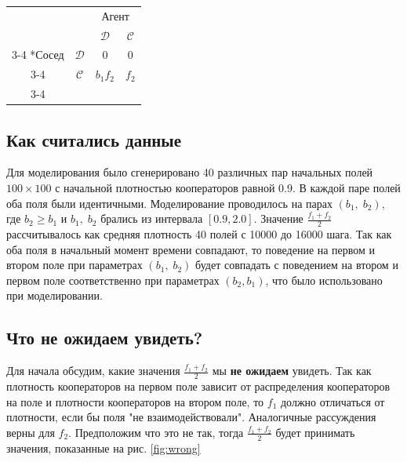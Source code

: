 \documentclass[12pt]{article}
\begin{document}
    \begin{minipage}{\linewidth}
    \centering
     \label{tab:2} 
    \setlength{\extrarowheight}{2pt}
    \begin{tabular}{cc|c|c|}
      & \multicolumn{1}{c}{} & \multicolumn{2}{c}{Агент}\\
      & \multicolumn{1}{c}{} & \multicolumn{1}{c}{$\mathcal{D}$}  & \multicolumn{1}{c}{$\mathcal{C}$} \\\cline{3-4}
      \multirow{2}*{Сосед}  & $\mathcal{D}$ & $0$ & $0$ \\\cline{3-4}
      & $\mathcal{C}$ & $b_1 f_2$ & $f_2$ \\\cline{3-4}
    \end{tabular}
    \end{minipage}
  
\subsection{Как считались данные}
    Для моделирования было сгенерировано 40 различных пар начальных полей $100\times100$ с начальной плотностью кооператоров равной $0.9$. В каждой паре полей оба поля были идентичными.
    Моделирование проводилось на парах $(b_1,\;b_2)$, где $b_2 \geq b_1$ и $b_1,\;b_2$ брались из интервала $[0.9, 2.0]$. Значение $\frac{f_1+f_2}{2}$ рассчитывалось как средняя плотность 40 полей с 10000 до 16000 шага.
    Так как оба поля в начальный момент времени совпадают, то поведение на первом и втором поле при параметрах $(b_1,\;b_2)$ будет совпадать с поведением на втором и первом поле соответственно при параметрах $(b_2, b_1)$, что было использовано при моделировании.
    
\subsection{Что не ожидаем увидеть?}
    Для начала обсудим, какие значения $\frac{f_1+f_2}{2}$ мы \textbf{не ожидаем} увидеть. Так как плотность кооператоров на первом поле зависит от распределения кооператоров на поле и плотности кооператоров на втором поле, то $f_1$ должно отличаться от плотности, если бы поля "не взаимодействовали". Аналогичные рассуждения верны для $f_2$. Предположим что это не так, тогда $\frac{f_1+f_2}{2}$ будет принимать значения, показанные на рис.
     \ref{fig:wrong}
    
\end{document}
